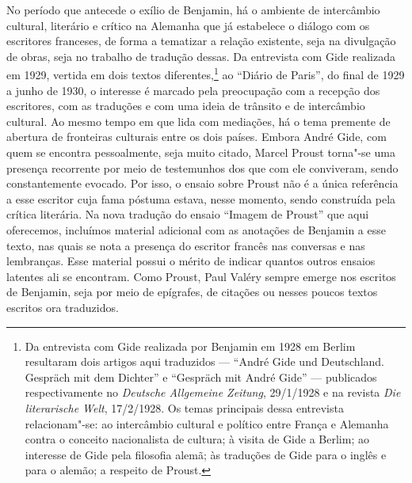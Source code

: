 No período que antecede o exílio de Benjamin, há o ambiente de
intercâmbio cultural, literário e crítico na Alemanha que já estabelece
o diálogo com os escritores franceses, de forma a tematizar a relação
existente, seja na divulgação de obras, seja no trabalho de tradução
dessas. Da entrevista com Gide realizada em 1929, vertida em dois textos
diferentes,\footnote{Da entrevista com Gide realizada por Benjamin em
  1928 em Berlim resultaram dois artigos aqui traduzidos --- ``André Gide
  und Deutschland. Gespräch mit dem Dichter'' e ``Gespräch mit André
  Gide'' --- publicados respectivamente no \emph{Deutsche Allgemeine
  Zeitung}, 29/1/1928 e na revista \emph{Die literarische Welt},
  17/2/1928. Os temas principais dessa entrevista relacionam"-se: ao
  intercâmbio cultural e político entre França e Alemanha contra o
  conceito nacionalista de cultura; à visita de Gide a Berlim; ao
  interesse de Gide pela filosofia alemã; às traduções de Gide para o
  inglês e para o alemão; a respeito de Proust.} ao ``Diário de
Paris'', do final de 1929 a junho de 1930, o interesse é marcado pela
preocupação com a recepção dos escritores, com as traduções e com uma
ideia de trânsito e de intercâmbio cultural. Ao mesmo tempo em que lida
com mediações, há o tema premente de abertura de fronteiras culturais
entre os dois países. Embora André Gide, com quem se encontra
pessoalmente, seja muito citado, Marcel Proust torna"-se uma presença
recorrente por meio de testemunhos dos que com ele conviveram, sendo
constantemente evocado. Por isso, o ensaio sobre Proust não é a única
referência a esse escritor cuja fama póstuma estava, nesse momento,
sendo construída pela crítica literária. Na nova tradução do ensaio
``Imagem de Proust'' que aqui oferecemos, incluímos material adicional
com as anotações de Benjamin a esse texto, nas quais se nota a presença
do escritor francês nas conversas e nas lembranças. Esse material possui
o mérito de indicar quantos outros ensaios latentes ali se encontram.
Como Proust, Paul Valéry sempre emerge nos escritos de Benjamin, seja
por meio de epígrafes, de citações ou nesses poucos textos escritos ora
traduzidos.

